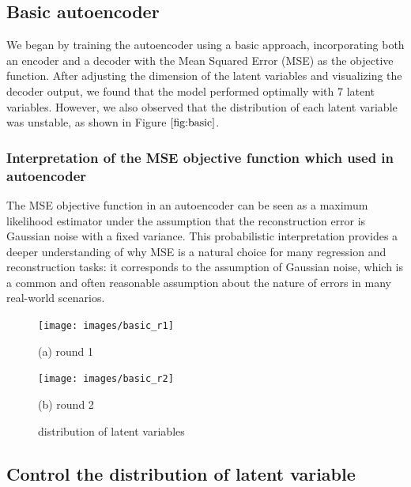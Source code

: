 \documentclass{article}
\begin{document}
\subsection{Basic autoencoder}
\label{ssec:basicautoencoder}

We began by training the autoencoder using a basic approach, incorporating both an encoder and a decoder with the Mean Squared Error (MSE) as the objective function. After adjusting the dimension of the latent variables and visualizing the decoder output, we found that the model performed optimally with 7 latent variables. However, we also observed that the distribution of each latent variable was unstable, as shown in Figure $\ref{fig:basic}$.

\subsubsection{Interpretation of the MSE objective function which used in autoencoder}
\label{sssec:mse}
The MSE objective function in an autoencoder can be seen as a maximum likelihood estimator under the assumption that the reconstruction error is Gaussian noise with a fixed variance. This probabilistic interpretation provides a deeper understanding of why MSE is a natural choice for many regression and reconstruction tasks: it corresponds to the assumption of Gaussian noise, which is a common and often reasonable assumption about the nature of errors in many real-world scenarios.

\begin{figure}[htb]
  \begin{minipage}[b]{1.0\linewidth}
    \centering
    \centerline{\texttt{[image: images/basic\_r1]}}
    \centerline{(a) round 1}\medskip
  \end{minipage}
  \hfill
  \begin{minipage}[b]{1.0\linewidth}
    \centering
    \centerline{\texttt{[image: images/basic\_r2]}}
    \centerline{(b) round 2 }\medskip
  \end{minipage}
  \caption{distribution of latent variables}
  \label{fig:basic}
  \end{figure}

\subsection{Control the distribution of latent variable}
\label{ssec:VAE}
\end{document}
